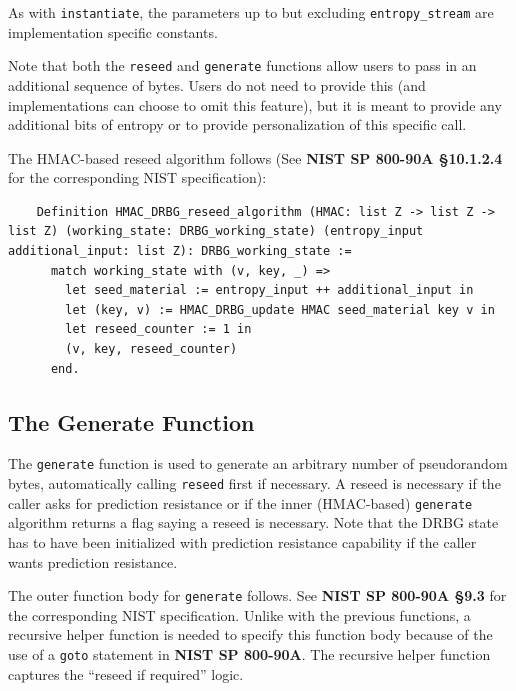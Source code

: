 \documentclass[pageno]{jpaper}
\newcommand{\stdtitle}[1]{\textbf{#1}}
\begin{document}
As with \lstinline{instantiate}, the parameters up to but excluding \lstinline{entropy_stream} are implementation specific constants.

Note that both the \lstinline{reseed} and \lstinline{generate} functions allow users to pass in an additional sequence of bytes. Users do not need to provide this (and implementations can choose to omit this feature), but it is meant to provide any additional bits of entropy or to provide personalization of this specific call.

The HMAC-based reseed algorithm follows (See \stdtitle{NIST SP 800-90A \S 10.1.2.4} for the corresponding NIST specification):

\begin{lstlisting}
    Definition HMAC_DRBG_reseed_algorithm (HMAC: list Z -> list Z -> list Z) (working_state: DRBG_working_state) (entropy_input additional_input: list Z): DRBG_working_state :=
      match working_state with (v, key, _) =>
        let seed_material := entropy_input ++ additional_input in
        let (key, v) := HMAC_DRBG_update HMAC seed_material key v in
        let reseed_counter := 1 in
        (v, key, reseed_counter)
      end.
\end{lstlisting}

\subsection{The Generate Function} \label{funcgenerate}
The \lstinline{generate} function is used to generate an arbitrary number of pseudorandom bytes, automatically calling \lstinline{reseed} first if necessary. A reseed is necessary if the caller asks for prediction resistance or if the inner (HMAC-based) \lstinline{generate} algorithm returns a flag saying a reseed is necessary. Note that the DRBG state has to have been initialized with prediction resistance capability if the caller wants prediction resistance.

The outer function body for \lstinline{generate} follows. See \stdtitle{NIST SP 800-90A \S 9.3} for the corresponding NIST specification. Unlike with the previous functions, a recursive helper function is needed to specify this function body because of the use of a \lstinline{goto} statement in \stdtitle{NIST SP 800-90A}. The recursive helper function captures the “reseed if required” logic.
\end{document}
